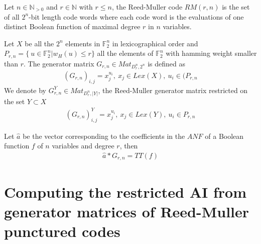 \documentclass[11pt]{llncs}
\begin{document}
\begin{definition}
	Let $n\in \mathbb{N}_{>0}$ and $r\in \mathbb{N}$ with $r\leq n$, the Reed-Muller code $RM(r,n)$ is the set of all $2^n$-bit length code words where each code word is the evaluations of one distinct Boolean function of maximal degree $r$ in $n$ variables.
\end{definition}

\begin{definition}\label{rmGenerator}
	Let $X$ be all the $2^n$ elements in $\mathbb{F}_2^n$ in lexicographical order and $P_{r,n} = \{\ u\in \mathbb{F}_2^n | w_H(u) \leq r\}$ all the elements of $\mathbb{F}_2^n$ with hamming weight smaller than $r$. The generator matrix $G_{r,n}\in Mat_{D_r^n,2^n}$ is defined as
	\begin{align*}
	\left(G_{r,n}\right)_{i,j} = x_j^{u_i}, \ x_j \in Lex\left(X\right),\ u_i \in (P_{r,n}
	\end{align*}
	We denote by $G_{r,n}^Y\in Mat_{D_r^n,|Y|}$, the Reed-Muller generator matrix restricted on the set $Y \subset X$
	\begin{align*}
	\left(G_{r,n}\right)^Y_{i,j} = x_j^{u_i}, \ x_j \in Lex(Y),\ u_i \in P_{r,n}
	\end{align*}
\end{definition}

\begin{remark}
	Let $\hat{a}$ be the vector corresponding to the coefficients in the $ANF$ of a Boolean function $f$ of $n$ variables and degree $r$, then
	\begin{align*}
	\hat{a} * G_{r,n} = TT(f)
	\end{align*}
\end{remark}




















\section{Computing the restricted AI from generator matrices of Reed-Muller punctured codes}\label{sec:RMapproach}
\end{document}
